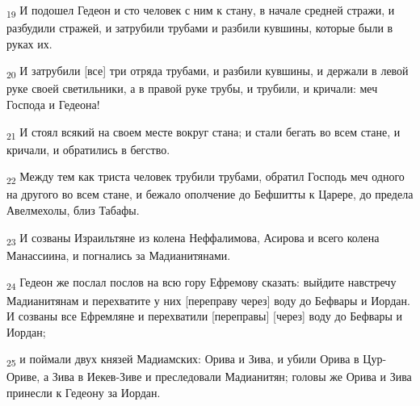 \begin{tcolorbox}
\textsubscript{19} И подошел Гедеон и сто человек с ним к стану, в начале средней стражи, и разбудили стражей, и затрубили трубами и разбили кувшины, которые были в руках их.
\end{tcolorbox}
\begin{tcolorbox}
\textsubscript{20} И затрубили [все] три отряда трубами, и разбили кувшины, и держали в левой руке своей светильники, а в правой руке трубы, и трубили, и кричали: меч Господа и Гедеона!
\end{tcolorbox}
\begin{tcolorbox}
\textsubscript{21} И стоял всякий на своем месте вокруг стана; и стали бегать во всем стане, и кричали, и обратились в бегство.
\end{tcolorbox}
\begin{tcolorbox}
\textsubscript{22} Между тем как триста человек трубили трубами, обратил Господь меч одного на другого во всем стане, и бежало ополчение до Бефшитты к Царере, до предела Авелмехолы, близ Табафы.
\end{tcolorbox}
\begin{tcolorbox}
\textsubscript{23} И созваны Израильтяне из колена Неффалимова, Асирова и всего колена Манассиина, и погнались за Мадианитянами.
\end{tcolorbox}
\begin{tcolorbox}
\textsubscript{24} Гедеон же послал послов на всю гору Ефремову сказать: выйдите навстречу Мадианитянам и перехватите у них [переправу через] воду до Бефвары и Иордан. И созваны все Ефремляне и перехватили [переправы] [через] воду до Бефвары и Иордан;
\end{tcolorbox}
\begin{tcolorbox}
\textsubscript{25} и поймали двух князей Мадиамских: Орива и Зива, и убили Орива в Цур-Ориве, а Зива в Иекев-Зиве и преследовали Мадианитян; головы же Орива и Зива принесли к Гедеону за Иордан.
\end{tcolorbox}
